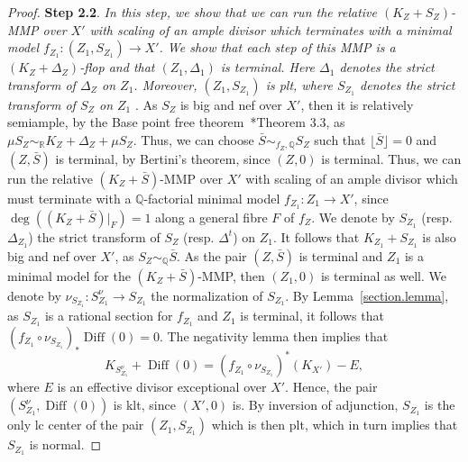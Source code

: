 \documentclass[11pt]{ip-journal}
\theoremstyle{definition}
\DeclareMathOperator{\diff}{\mathrm{Diff}}
\newcommand{\bQ}{\mathbb{Q}}
\begin{document}
\begin{proof}
\medskip

{\bf Step 2.2}. 
{\it In this step, we show that we can run the relative 
$(K_Z+S_Z)$-MMP 
over 
$X'$ 
with scaling of an ample divisor which terminates with a minimal model 
$f_{Z_1} \colon (Z_1, S_{Z_1}) \to X'$. 
We show that each step of this MMP is a 
$(K_{Z} +\Delta_Z)$-flop 
and that 
$(Z_1, \Delta_{1})$ is terminal.
Here 
$\Delta_{1}$ 
denotes the strict transform of 
$\Delta_Z$ 
on 
$Z_1$.
Moreover, 
$(Z_1, S_{Z_1})$ 
is plt, where 
$S_{Z_1}$ 
denotes the strict transform of 
$S_Z$ 
on 
$Z_1$
}.
\newline
As 
$S_Z$ 
is big and nef over 
$X'$, 
then it is relatively semiample, by the Base point free theorem~\cite{KM}*{Theorem 3.3}, as 
$\mu S_Z \sim_\mathbb{R} K_{Z} +\Delta_Z +\mu S_Z$.
Thus, we can choose 
$\bar{S} \sim_{f_Z, \bQ} S_Z$ 
such that
$\lfloor \bar{S} \rfloor =0$
and
$(Z, \bar{S})$ 
is terminal, by Bertini's theorem, since 
$(Z, 0)$ 
is terminal.
Thus, we can run the 
relative 
$(K_Z + \bar{S})$-MMP 
over 
$X'$ 
with scaling of an ample divisor which must terminate with a 
$\mathbb{Q}$-factorial 
minimal model 
$f_{Z_1} \colon Z_1 \to X'$, 
since 
$\deg((K_Z+\bar{S})\vert_F)=1$ 
along a general fibre 
$F$ 
of 
$f_Z$.
\newline 
We denote by 
$S_{Z_1}$ 
(resp. 
$\Delta_{Z_1}$) 
the strict transform of 
$S_Z$ 
(resp. 
$\Delta^t$) 
on 
$Z_1$.
It follows that $K_{Z_1}+S_{Z_1}$ is also big and nef over $X'$, as $S_Z \sim_\mathbb{Q} \bar{S}$.
As the pair $(Z, \bar{S})$ is terminal and $Z_1$ is a minimal model for the $(K_Z+\bar{S})$-MMP, then $(Z_1, 0)$ is terminal as well.
\newline
We denote by $\nu_{S_{Z_1}} \colon S_{Z_1}^\nu \to S_{Z_1}$ the normalization of $S_{Z_1}$.
By Lemma~\ref{section.lemma}, as $S_{Z_1}$ is a rational section for $f_{Z_1}$ and $Z_1$ is terminal, it follows that $(f_{Z_1} \circ \nu_{S_{Z_1}})_\ast \diff(0)=0$.
The negativity lemma then implies that 
\begin{equation}
\label{log.pullback.plt.eqn2}
    K_{S_{Z_1}^\nu}+\diff(0)=(f_{Z_1} \circ \nu_{S_{Z_1}})^\ast(K_{X'}) -E,
\end{equation}
where $E$ is an effective divisor exceptional over $X'$.
Hence, the pair $(S_{Z_1}^\nu, \diff(0))$ is klt, since $(X', 0)$ is. 
By inversion of adjunction, 
$S_{Z_1}$ 
is the only lc center of the pair 
$(Z_1, S_{Z_1})$
which is then plt, 
which in turn implies that 
$S_{Z_1}$ 
is normal. 


\end{proof}
\end{document}
